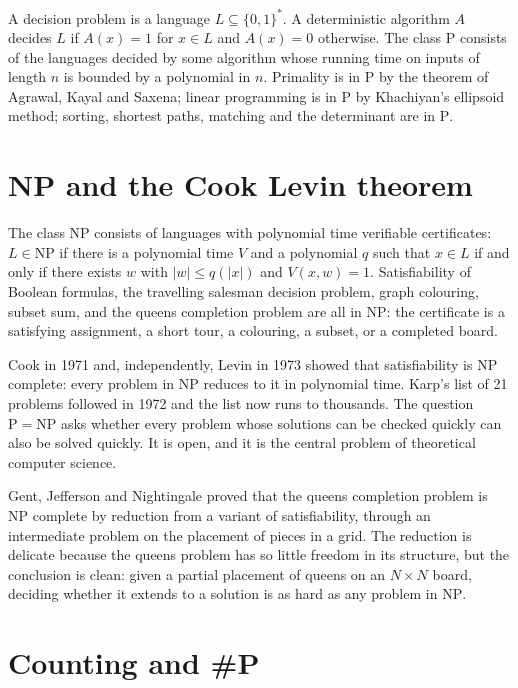 \documentclass[11pt,twoside,openany]{book}
\theoremstyle{plain}
\theoremstyle{definition}
\theoremstyle{remark}
\newcommand{\NP}{\mathrm{NP}}
\newcommand{\Pc}{\mathrm{P}}
\begin{document}
A decision problem is a language $L \subseteq \{0,1\}^*$. A deterministic algorithm $A$ decides $L$ if $A(x) = 1$ for $x \in L$ and $A(x) = 0$ otherwise. The class $\Pc$ consists of the languages decided by some algorithm whose running time on inputs of length $n$ is bounded by a polynomial in $n$. Primality is in $\Pc$ by the theorem of Agrawal, Kayal and Saxena; linear programming is in $\Pc$ by Khachiyan's ellipsoid method; sorting, shortest paths, matching and the determinant are in $\Pc$.

\section{NP and the Cook Levin theorem}

The class $\NP$ consists of languages with polynomial time verifiable certificates: $L \in \NP$ if there is a polynomial time $V$ and a polynomial $q$ such that $x \in L$ if and only if there exists $w$ with $|w| \le q(|x|)$ and $V(x, w) = 1$. Satisfiability of Boolean formulas, the travelling salesman decision problem, graph colouring, subset sum, and the queens completion problem are all in $\NP$: the certificate is a satisfying assignment, a short tour, a colouring, a subset, or a completed board.

Cook in 1971 and, independently, Levin in 1973 showed that satisfiability is $\NP$ complete: every problem in $\NP$ reduces to it in polynomial time. Karp's list of 21 problems followed in 1972 and the list now runs to thousands. The question $\Pc = \NP$ asks whether every problem whose solutions can be checked quickly can also be solved quickly. It is open, and it is the central problem of theoretical computer science.

Gent, Jefferson and Nightingale proved that the queens completion problem is $\NP$ complete by reduction from a variant of satisfiability, through an intermediate problem on the placement of pieces in a grid. The reduction is delicate because the queens problem has so little freedom in its structure, but the conclusion is clean: given a partial placement of queens on an $N \times N$ board, deciding whether it extends to a solution is as hard as any problem in $\NP$.

\section{Counting and \#P}
\end{document}
